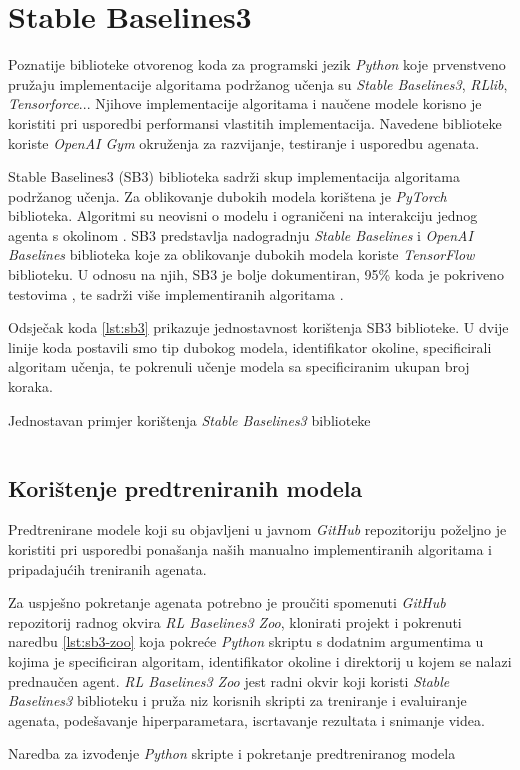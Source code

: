 \chapter{Stable Baselines3}

Poznatije biblioteke otvorenog koda za programski jezik \textit{Python} koje prvenstveno pružaju implementacije algoritama podržanog učenja su \textit{Stable Baselines3}, \textit{RLlib}, \textit{Tensorforce}... Njihove implementacije algoritama i naučene modele korisno je koristiti pri usporedbi performansi vlastitih implementacija. Navedene biblioteke koriste \textit{OpenAI Gym} okruženja za razvijanje, testiranje i usporedbu agenata.

Stable Baselines3 (SB3) biblioteka sadrži skup implementacija algoritama podržanog učenja. Za oblikovanje dubokih modela korištena je \textit{PyTorch} biblioteka. Algoritmi su neovisni o modelu  i ograničeni na interakciju jednog agenta s okolinom . SB3 predstavlja nadogradnju \textit{Stable Baselines} i \textit{OpenAI Baselines} biblioteka koje za oblikovanje dubokih modela koriste \textit{TensorFlow} biblioteku. U odnosu na njih, SB3 je bolje dokumentiran, 95\% koda je pokriveno testovima , te sadrži više implementiranih algoritama \cite{SB3}. 

Odsječak koda \ref{lst:sb3} prikazuje jednostavnost korištenja SB3 biblioteke. U dvije linije koda postavili smo tip dubokog modela, identifikator okoline, specificirali algoritam učenja, te pokrenuli učenje modela sa specificiranim ukupan broj koraka.

\begin{listing}[H]
    \caption{Jednostavan primjer korištenja \textit{Stable Baselines3} biblioteke}
    \inputminted{python}{snippets/sb3.py}
    \label{lst:sb3}
\end{listing}

\section{Korištenje predtreniranih modela}

Predtrenirane modele koji su objavljeni u javnom \textit{GitHub} repozitoriju \cite{sb3-alg-repo} poželjno je koristiti pri usporedbi ponašanja naših manualno implementiranih algoritama i pripadajućih treniranih agenata.

Za uspješno pokretanje agenata potrebno je proučiti spomenuti \textit{GitHub} repozitorij radnog okvira \textit{RL Baselines3 Zoo}, klonirati projekt i pokrenuti naredbu \ref{lst:sb3-zoo} koja pokreće \textit{Python} skriptu s dodatnim argumentima u kojima je specificiran algoritam, identifikator okoline i direktorij u kojem se nalazi prednaučen agent. \textit{RL Baselines3 Zoo} jest radni okvir koji koristi \textit{Stable Baselines3} biblioteku i pruža niz korisnih skripti za treniranje i evaluiranje agenata, podešavanje hiperparametara, iscrtavanje rezultata i snimanje videa.

\begin{listing}[H]
    \caption{Naredba za izvođenje \textit{Python} skripte i pokretanje predtreniranog modela}
    \inputminted{powershell}{snippets/sb3-zoo.txt}
    \label{lst:sb3-zoo}
\end{listing}
